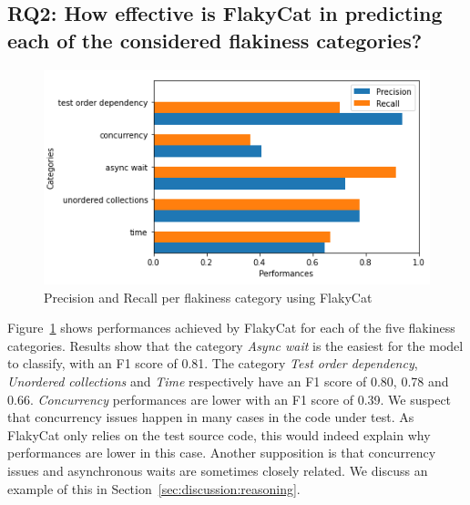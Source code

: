 \subsection{RQ2: How effective is FlakyCat in predicting each of the considered flakiness categories?}

\begin{figure}[htbp]
\centering
\includegraphics[scale=0.8]{figures/flakycat/FSL.PNG}
\caption{Precision and Recall per flakiness category using FlakyCat}
\label{fig:FSL}
\end{figure}

Figure~\ref{fig:FSL} shows performances achieved by FlakyCat for each of the five flakiness categories. Results show that the category \textit{Async wait} is the easiest for the model to classify, with an F1 score of 0.81. The category \textit{Test order dependency}, \textit{Unordered collections} and \textit{Time} respectively have an F1 score of 0.80, 0.78 and 0.66. \textit{Concurrency} performances are lower with an F1 score of 0.39. 
We suspect that concurrency issues happen in many cases in the code under test. As FlakyCat only relies on the test source code, this would indeed explain why performances are lower in this case. Another supposition is that concurrency issues and asynchronous waits are sometimes closely related. We discuss an example of this in Section~\ref{sec:discussion:reasoning}. \\






